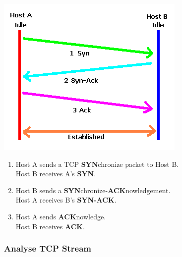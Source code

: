\begin{minipage}{.4\linewidth}
	\includegraphics[width=\textwidth]{media/3way.png}
\end{minipage}
\begin{minipage}{.6\linewidth}
	\begin{enumerate}
		\item Host A sends a TCP \textbf{SYN}chronize packet to Host B.
		\\ Host B receives A's \textbf{SYN}.
		\item Host B sends a \textbf{SYN}chronize-\textbf{ACK}nowledgement.
		\\ Host A receives B's \textbf{SYN-ACK}.
		\item Host A sends \textbf{ACK}nowledge.
		\\ Host B receives \textbf{ACK}.
	\end{enumerate}
\end{minipage}


\subsubsection{Analyse TCP Stream}

